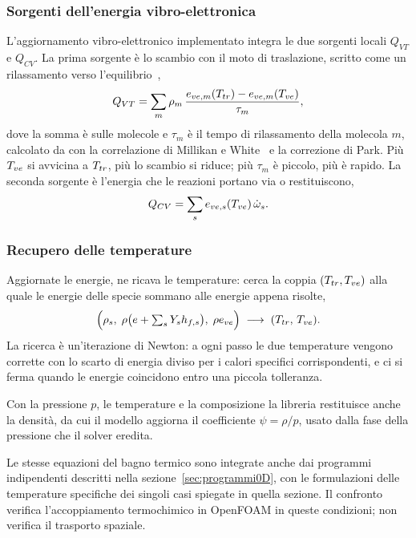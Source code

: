 \subsubsection{Sorgenti dell'energia vibro-elettronica}
\label{sec:implementato-eve}

L'aggiornamento vibro-elettronico implementato integra le due sorgenti locali
$Q_{VT}$ e $Q_{CV}$.
La prima sorgente è lo scambio con il moto di traslazione, scritto come un
rilassamento verso l'equilibrio~\cite{landau1936},
\begin{equation}
  Q_{VT} = \sum_m \rho_m\,
  \frac{e_{ve,m}(T_{tr}) - e_{ve,m}(T_{ve})}{\tau_m} ,
\end{equation}
dove la somma è sulle molecole e $\tau_m$ è il tempo di rilassamento della
molecola $m$, calcolato da \mpp{} con la correlazione di Millikan e
White~\cite{millikan1963} e la correzione di Park. Più $T_{ve}$ si avvicina a
$T_{tr}$, più lo scambio si riduce; più $\tau_m$ è piccolo, più è rapido. La
seconda sorgente è l'energia che le reazioni portano via o restituiscono,
\begin{equation}
  Q_{CV} = \sum_s e_{ve,s}(T_{ve})\,\dot\omega_s .
\end{equation}
\subsubsection{Recupero delle temperature}
\label{sec:implementato-temperature}

Aggiornate le energie, \mpp{} ne ricava le temperature: cerca la coppia
$(T_{tr},T_{ve})$ alla quale le energie delle specie sommano alle energie appena
risolte,
\begin{equation}
  \Big(\rho_s,\; \rho\big(e + \textstyle\sum_s Y_s h_{f,s}\big),\; \rho e_{ve}\Big)
  \;\longrightarrow\; (T_{tr},\,T_{ve}) .
\end{equation}
La ricerca è un'iterazione di Newton: a ogni passo le due temperature vengono
corrette con lo scarto di energia diviso per i calori specifici
corrispondenti, e ci si ferma quando le energie coincidono entro una piccola
tolleranza.

Con la pressione $p$, le temperature e la composizione la libreria restituisce
anche la densità, da cui il modello aggiorna il coefficiente
$\psi = \rho/p$, usato dalla fase della pressione che il solver
eredita.

Le stesse equazioni del bagno termico sono integrate anche dai programmi
indipendenti descritti nella sezione~\ref{sec:programmi0D}, con le formulazioni
delle temperature specifiche dei singoli casi spiegate in quella sezione.
Il confronto verifica l'accoppiamento termochimico in OpenFOAM in queste
condizioni; non verifica il trasporto spaziale.

